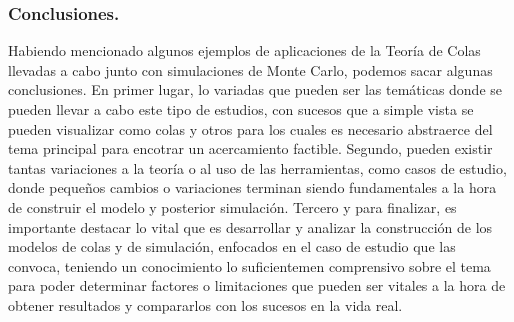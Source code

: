 \subsubsection{Conclusiones.}
 \noindent Habiendo mencionado algunos ejemplos de aplicaciones de la Teoría de Colas llevadas a cabo junto con simulaciones de Monte Carlo, podemos sacar algunas conclusiones. En primer lugar, lo variadas que pueden ser las temáticas donde se pueden llevar a cabo este tipo de estudios, con sucesos que a simple vista se pueden visualizar como colas y otros para los cuales es necesario abstraerce del tema principal para encotrar un acercamiento factible. Segundo, pueden existir tantas variaciones a la teoría o al uso de las herramientas, como casos de estudio, donde pequeños cambios o variaciones terminan siendo fundamentales a la hora de construir el modelo y posterior simulación. Tercero y para finalizar, es importante destacar lo vital que es desarrollar y analizar la construcción de los modelos de colas y de simulación, enfocados en el caso de estudio que las convoca, teniendo un conocimiento lo suficientemen comprensivo sobre el tema para poder determinar factores o limitaciones que pueden ser vitales a la hora de obtener resultados y compararlos con los sucesos en la vida real.

